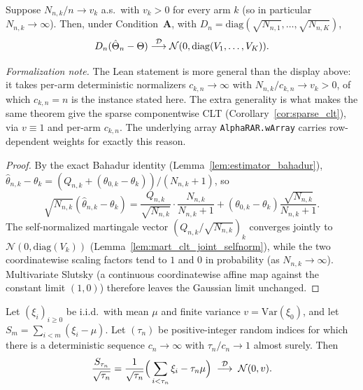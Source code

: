\begin{corollary}\label{cor:mart_clt_componentwise}
\leanok
{}
Suppose $N_{n,k}/n\to v_k$ a.s.\ with $v_k>0$ for every arm $k$ (so in particular
$N_{n,k}\to\infty$). Then, under Condition~\textbf{A}, with
$D_n=\mathrm{diag}(\sqrt{N_{n,1}},\dots,\sqrt{N_{n,K}})$,
\[
  D_n(\hat{\Theta}_n-\Theta)\overset{\mathcal{D}}{\longrightarrow}\mathcal{N}(0,\mathrm{diag}(V_1,\dots,V_K)).
\]
\end{corollary}

\emph{Formalization note.} The Lean statement is more general than the display above: it takes
per-arm deterministic normalizers $c_{k,n}\to\infty$ with $N_{n,k}/c_{k,n}\to v_k>0$, of which
$c_{k,n}=n$ is the instance stated here. The extra generality is what makes the same theorem give the
sparse componentwise CLT (Corollary~\ref{cor:sparse_clt}), via $v\equiv1$ and per-arm $c_{k,n}$. The
underlying array \texttt{AlphaRAR.wArray} carries row-dependent weights for exactly this reason.

\begin{proof}\leanok
{}
By the exact Bahadur identity (Lemma~\ref{lem:estimator_bahadur}),
$\hat\theta_{n,k}-\theta_k=(Q_{n,k}+(\theta_{0,k}-\theta_k))/(N_{n,k}+1)$, so
\[
  \sqrt{N_{n,k}}(\hat\theta_{n,k}-\theta_k)
    = \frac{Q_{n,k}}{\sqrt{N_{n,k}}}\cdot\frac{N_{n,k}}{N_{n,k}+1}
      + (\theta_{0,k}-\theta_k)\frac{\sqrt{N_{n,k}}}{N_{n,k}+1}.
\]
The self-normalized martingale vector $(Q_{n,k}/\sqrt{N_{n,k}})_k$ converges jointly to
$\mathcal N(0,\mathrm{diag}(V_k))$ (Lemma~\ref{lem:mart_clt_joint_selfnorm}), while the two
coordinatewise scaling factors tend to $1$ and $0$ in probability (as $N_{n,k}\to\infty$).
Multivariate Slutsky (a continuous coordinatewise affine map against the constant limit $(1,0)$)
therefore leaves the Gaussian limit unchanged.
\end{proof}

\begin{lemma}\label{lem:anscombe_clt}
\leanok
{}
Let $(\xi_i)_{i\ge0}$ be i.i.d.\ with mean $\mu$ and finite variance $v=\mathrm{Var}(\xi_0)$, and let
$S_m=\sum_{i<m}(\xi_i-\mu)$. Let $(\tau_n)$ be positive-integer random indices for which there is a
deterministic sequence $c_n\to\infty$ with $\tau_n/c_n\to1$ almost surely. Then
\[
  \frac{S_{\tau_n}}{\sqrt{\tau_n}}
    = \frac1{\sqrt{\tau_n}}\Big(\sum_{i<\tau_n}\xi_i-\tau_n\mu\Big)
  \;\overset{\mathcal{D}}{\longrightarrow}\; \mathcal N(0,v).
\]
\end{lemma}

